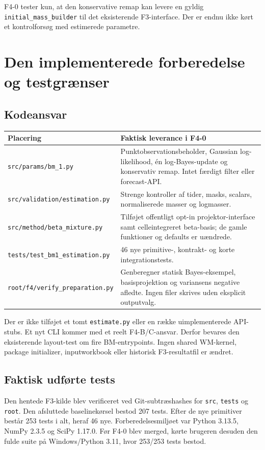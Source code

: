 F4-0 tester kun, at den konservative remap kan levere en gyldig \texttt{initial\_mass\_builder} til det eksisterende F3-interface. Der er endnu ikke kørt et kontrolforsøg med estimerede parametre.

\section{Den implementerede forberedelse og testgrænser}
\subsection{Kodeansvar}
\begin{longtable}{@{}p{.40\linewidth}p{.55\linewidth}@{}}
\toprule
Placering & Faktisk leverance i F4-0\\\midrule\endhead
\texttt{src/params/bm\_1.py} & Punktobservationsbeholder, Gaussian log-likelihood, én log-Bayes-update og konservativ remap. Intet færdigt filter eller forecast-API.\\
\texttt{src/validation/estimation.py} & Strenge kontroller af tider, masks, scalars, normaliserede masser og logmasser.\\
\texttt{src/method/beta\_mixture.py} & Tilføjet offentligt opt-in projektor-interface samt celleintegreret beta-basis; de gamle funktioner og defaults er uændrede.\\
\texttt{tests/test\_bm1\_estimation.py} & 46 nye primitive-, kontrakt- og korte integrationstests.\\
\texttt{root/f4/verify\_preparation.py} & Genberegner statisk Bayes-eksempel, basisprojektion og variansens negative afledte. Ingen filer skrives uden eksplicit outputvalg.\\
\bottomrule
\end{longtable}

Der er ikke tilføjet et tomt \texttt{estimate.py} eller en række uimplementerede API-stubs. Et nyt CLI kommer med et reelt F4-B/C-ansvar. Derfor bevares den eksisterende layout-test om fire BM-entrypoints. Ingen shared WM-kernel, package initializer, inputworkbook eller historisk F3-resultatfil er ændret.

\subsection{Faktisk udførte tests}
Den hentede F3-kilde blev verificeret ved Git-subtræshashes for \texttt{src}, \texttt{tests} og \texttt{root}. Den afsluttede baselinekørsel bestod 207 tests. Efter de nye primitiver består 253 tests i alt, heraf 46 nye. Forberedelsesmiljøet var Python 3.13.5, NumPy 2.3.5 og SciPy 1.17.0. Før F4-0 blev merged, kørte brugeren desuden den fulde suite på Windows/Python 3.11, hvor 253/253 tests bestod.

